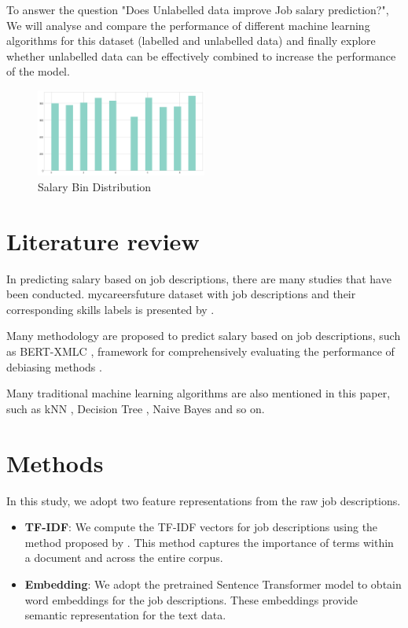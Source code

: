 \documentclass[11pt]{article}
\begin{document}
To answer the question "Does Unlabelled data improve Job salary prediction?", 
We will analyse and compare the performance of different machine learning algorithms for this dataset (labelled and unlabelled data) 
and finally explore whether unlabelled data can be effectively combined to increase the performance of the model.

\begin{figure}[t]
    \centering
    \includegraphics[width=0.5\textwidth]{dataset_output.png}
    \caption{Salary Bin Distribution}
    \label{fig:dataset_output}
\end{figure}

\section{Literature review}

In predicting salary based on job descriptions, there are many studies that have been conducted.
mycareersfuture dataset with job descriptions and their corresponding skills labels is presented by \cite{bhola-etal-2020-retrieving}.

Many methodology are proposed to predict salary based on job descriptions, such as BERT-XMLC \cite{bhola-etal-2020-retrieving}, 
framework for comprehensively evaluating the performance of debiasing methods \cite{han-etal-2022-systematic}.

Many traditional machine learning algorithms are also mentioned in this paper, 
such as kNN \cite{knn-Zhang2019/08}, 
Decision Tree \cite{dt_8718711}, 
Naive Bayes \cite{nb_10.1007/BFb0029444} and so on.



\section{Methods}

In this study, we adopt two feature representations from the raw job descriptions.

\begin{itemize}
    \item \textbf{TF-IDF}: We compute the TF-IDF vectors for job descriptions using the method proposed by \cite{manning2008introduction}. This method captures the importance of terms within a document and across the entire corpus.
    \item \textbf{Embedding}: We adopt the pretrained Sentence Transformer model \cite{reimers-gurevych-2019-sentence} to obtain word embeddings for the job descriptions. These embeddings provide semantic representation for the text data.
\end{itemize}
\end{document}
